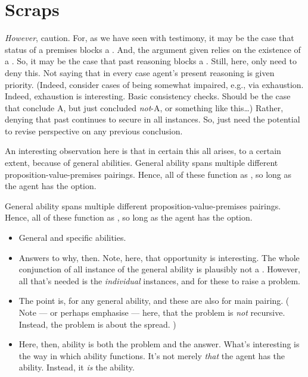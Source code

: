 \section{Scraps}
\label{sec:scraps}

\begin{note}
  \emph{However}, caution.
  For, as we have seen with testimony, it may be the case that status of a premises blocks a \requ{}.
  And, the argument given relies on the existence of a \requ{}.
  So, it may be the case that past reasoning blocks a \requ{}.
  Still, here, only need to deny this.
  Not saying that in every case agent's present reasoning is given priority.
  (Indeed, consider cases of being somewhat impaired, e.g., via exhaustion.
  Indeed, exhaustion is interesting.
  Basic consistency checks.
  Should be the case that conclude A, but just concluded \emph{not}-A, or something like this\dots)
  Rather, denying that past continues to secure in all instances.
  So, just need the potential to revise perspective on any previous conclusion.
\end{note}

\begin{note}
  An interesting observation here is that in certain this all arises, to a certain extent, because of general abilities.
  General ability spans multiple different proposition-value-premises pairings.
  Hence, all of these function as , so long as the agent has the option.

  General ability spans multiple different proposition-value-premises pairings.
  Hence, all of these function as , so long as the agent has the option.

  \begin{itemize}
  \item
    General and specific abilities.
  \item
    Answers to why, then.
    Note, here, that opportunity is interesting.
    The whole conjunction of all instance of the general ability is plausibly not a \requ{}.
    However, all that's needed is the \emph{individual} instances, and for these to raise a problem.
  \item
    The point is,  for any general ability, and these are also  for main pairing.
    (%
    Note --- or perhaps emphasise --- here, that the problem is \emph{not} recursive.
    Instead, the problem is about the spread.%
    )
  \item
    Here, then, ability is both the problem and the answer.
    What's interesting is the way in which ability functions.
    It's not merely \emph{that} the agent has the ability.
    Instead, it \emph{is} the ability.
  \end{itemize}
\end{note}

